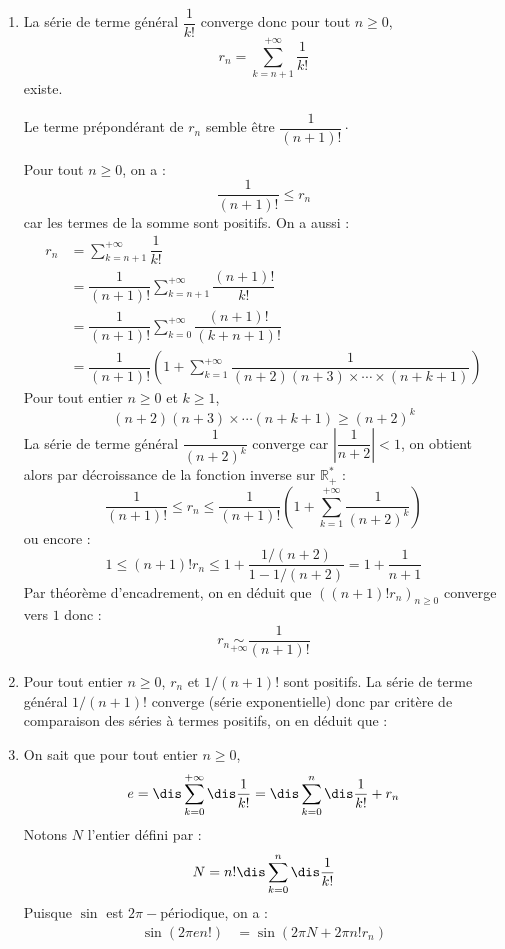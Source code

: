 \documentclass[a4paper,twoside,french,10pt]{VcCours}
\begin{document}
\begin{enumerate}
    \begin{enumerate}
    \item La série de terme général $\dfrac{1}{k!}$ converge donc pour tout $n \geq 0$,
    $$ r_n = \sum_{k=n+1}^{+ \infty} \dfrac{1}{k!}$$
    existe. 
    
    \medskip
    
    \noindent Le terme prépondérant de $r_n$ semble être $\dfrac{1}{(n+1)!}\cdot$
    
    \medskip
    
    \noindent Pour tout $n \geq 0$, on a :
    $$ \dfrac{1}{(n+1)!} \leq r_n$$
    car les termes de la somme sont positifs. On a aussi :
    \begin{align*}
    r_n & = \sum_{k=n+1}^{+ \infty} \dfrac{1}{k!} \\
    & = \dfrac{1}{(n+1)!} \sum_{k=n+1}^{+ \infty} \dfrac{(n+1)!}{k!} \\
    & = \dfrac{1}{(n+1)!} \sum_{k=0}^{+ \infty} \dfrac{(n+1)!}{(k+n+1)!} \\
    & = \dfrac{1}{(n+1)!} \left(1 + \sum_{k=1}^{+ \infty} \dfrac{1}{(n+2)(n+3) \times \cdots \times (n+k+1)} \right)
    \end{align*}
    Pour tout entier $n \geq 0$ et $k \geq 1$,
    $$ (n+2)(n+3) \times \cdots (n+k+1) \geq (n+2)^k$$
    La série de terme général $\dfrac{1}{(n+2)^k}$ converge car $\left\vert \dfrac{1}{n+2} \right\vert<1$, on obtient alors par décroissance de la fonction inverse sur $\mathbb{R}_+^*$ :
    $$ \dfrac{1}{(n+1)!} \leq r_n \leq \dfrac{1}{(n+1)!} \left(1+ \sum_{k=1}^{+ \infty} \dfrac{1}{(n+2)^k} \right)$$
    ou encore :
    $$ 1 \leq (n+1)! r_n \leq 1 + \dfrac{1/(n+2)}{1-1/(n+2)} = 1 + \dfrac{1}{n+1}$$
    Par théorème d'encadrement, on en déduit que $((n+1)! r_n)_{n \geq 0}$ converge vers $1$ donc :
    $$ \boxed{r_n \underset{ + \infty}{\sim} \dfrac{1}{(n+1)!}}$$
    \item Pour tout entier $n \geq 0$, $r_n$ et $1/(n+1)!$ sont positifs. La série de terme général $1/(n+1)!$ converge (série exponentielle) donc par critère de comparaison des séries à termes positifs, on en déduit que :
    \item On sait que pour tout entier $n \geq 0$,
    $$e=\dis\sum_{k=0}^{+\infty}\dis\frac{1}{k!}=\dis\sum_{k=0}^{n}\dis\frac{1}{k!}+r_n$$
    Notons $N$ l'entier défini par :
    $$ N= n!\dis\sum_{k=0}^{n}\dis\frac{1}{k!}$$ 
    Puisque $\sin$ est $2\pi-$périodique, on a :
    \begin{align*}
    \sin(2\pi e n!) & =\sin(2\pi N + 2\pi n!r_n) \\

\end{align*}
\end{enumerate}
\end{enumerate}
\end{document}

